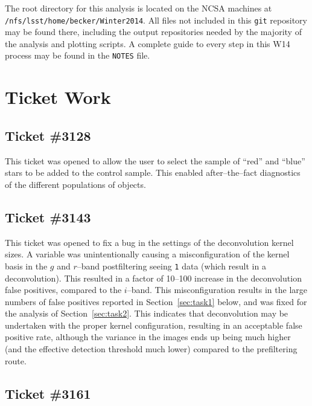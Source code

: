 \documentclass[prd, nofootinbib, floatfix, 11pt, tightenlines, times]{article}
\begin{document}
\clearpage
\begin{appendices}

The root directory for this analysis is located on the NCSA machines
at \\{\tt /nfs/lsst/home/becker/Winter2014}.  All files not included in
this {\tt git} repository may be found there, including the output
repositories needed by the majority of the analysis and plotting
scripts.  A complete guide to every step in this W14 process may be
found in the {\tt NOTES} file.

\section{Ticket Work}

\subsection{Ticket \#3128 \label{sec:3128}}

This ticket was opened to allow the user to select the sample of
``red'' and ``blue'' stars to be added to the control sample.  This
enabled after--the--fact diagnostics of the different populations of
objects.

\subsection{Ticket \#3143 \label{sec:3143}}

This ticket was opened to fix a bug in the settings of the
deconvolution kernel sizes.  A variable was unintentionally causing a
misconfiguration of the kernel basis in the $g$ and $r$--band
postfiltering seeing {\tt 1} data (which result in a deconvolution).
This resulted in a factor of 10--100 increase in the deconvolution
false positives, compared to the $i$--band.  This misconfiguration
results in the large numbers of false positives reported in
Section~\ref{sec:task1} below, and was fixed for the analysis of
Section~\ref{sec:task2}.  This indicates that deconvolution may be
undertaken with the proper kernel configuration, resulting in an
acceptable false positive rate, although the variance in the images
ends up being much higher (and the effective detection threshold much
lower) compared to the prefiltering route.

\subsection{Ticket \#3161 \label{sec:3161}}


\end{appendices}
\end{document}
